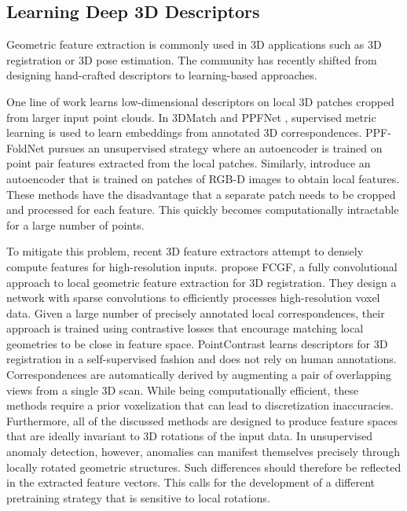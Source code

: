 \documentclass[twoside,11pt]{article}
\begin{document}
\subsection{Learning Deep 3D Descriptors}

Geometric feature extraction is commonly used in 3D applications such as 3D registration or 3D pose estimation. The community has recently shifted from designing hand-crafted descriptors \citep{salti_2014_shot_descriptor,tombari_2010_descriptors} to learning-based approaches. 

One line of work learns low-dimensional descriptors on local 3D patches cropped from larger input point clouds. In 3DMatch \citep{Zeng_2017_3DMatch} and PPFNet \citep{PPF_Net}, supervised metric learning is used to learn embeddings from annotated 3D correspondences. PPF-FoldNet \citep{PPF_Fold_Net} pursues an unsupervised strategy where an autoencoder is trained on point pair features extracted from the local patches. Similarly,  \citet{wadim2016localrgbddescriptors} introduce an autoencoder that is trained on patches of {RGB-D} images to obtain local features. These methods have the disadvantage that a separate patch  needs to be cropped and processed for each feature. This quickly becomes computationally intractable for a large number of points.

To mitigate this problem, recent 3D feature extractors attempt to densely compute features for high-resolution inputs. \citet{choy2019fcgf} propose FCGF, a fully convolutional approach to local geometric feature extraction for 3D registration. They design a network with sparse convolutions to efficiently processes high-resolution voxel data. Given a large number of precisely annotated local correspondences, their approach is trained using contrastive losses that encourage matching local geometries to be close in feature space. PointContrast \citep{PointContrast2020} learns descriptors for 3D registration in a self-supervised fashion and does not rely on human annotations. Correspondences are automatically derived by augmenting a pair of overlapping views from a single 3D scan. While being computationally efficient, these methods require a prior voxelization that can lead to discretization inaccuracies. Furthermore, all of the discussed methods are designed to produce feature spaces that are ideally invariant to 3D rotations of the input data. In unsupervised anomaly detection, however, anomalies can manifest themselves precisely through locally rotated geometric structures. Such differences should therefore be reflected in the extracted feature vectors. This calls for the development of a different pretraining strategy that is sensitive to local rotations.
\end{document}
